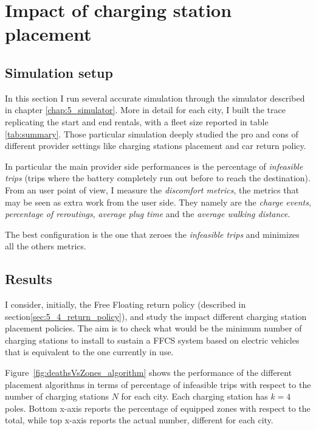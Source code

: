 \section{Impact of charging station placement}
\label{sec:freefloating}

\subsection{Simulation setup}
In this section I run several accurate simulation through the simulator described in chapter \ref{chap:5_simulator}. More in detail for each city, I built the trace replicating the start and end rentals, with a fleet size reported in table \ref{tab:summary}. Those particular simulation deeply studied the pro and cons of different provider settings like charging stations placement and car return policy.

In particular the main provider side performances is the percentage of \textit{infeasible trips} (trips where the battery completely run out before to reach the destination). From an user point of view, I measure the \textit{discomfort metrics}, the metrics that may be seen as extra work from the user side. They namely are the \textit{charge events}, \textit{percentage of reroutings}, \textit{average plug time} and the \textit{average walking distance}. 

The best configuration is the one that zeroes the \textit{infeasible trips} and minimizes all the others metrics.

\subsection{Results}

I consider, initially,  the Free Floating return policy (described in section\ref{sec:5_4_return_policy}), and study the impact different charging station placement policies. The aim is to check what would be the minimum number of charging stations to install to sustain a FFCS system based on electric vehicles that is equivalent to the one currently in use.

Figure~\ref{fig:deathsVsZones_algorithm} shows the performance of the different placement algorithms in terms of percentage of infeasible trips  with respect to  the number of charging stations $N$ for each city. Each charging station has $k=4$ poles. Bottom x-axis reports the percentage of equipped zones with respect to the total, while top x-axis reports the actual number, different for each city.

